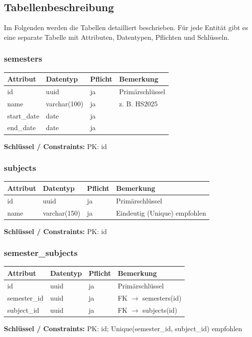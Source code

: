 \documentclass[12pt,a4paper]{article}
\begin{document}
    \subsection{Tabellenbeschreibung}
    Im Folgenden werden die Tabellen detailliert beschrieben. Für jede Entität gibt es eine separate Tabelle mit Attributen, Datentypen, Pflichten und Schlüsseln.

    \subsubsection{semesters}
    \begin{longtable}{|L{4cm}|L{3cm}|L{3cm}|L{4cm}|}
        \hline
        \textbf{Attribut} & \textbf{Datentyp} & \textbf{Pflicht} & \textbf{Bemerkung} \\ \hline
        id & uuid & ja & Primärschlüssel \\ \hline
        name & varchar(100) & ja & z. B. HS2025 \\ \hline
        start\_date & date & ja &  \\ \hline
        end\_date & date & ja &  \\ \hline
    \end{longtable}
    \textbf{Schlüssel / Constraints:} PK: id

    \subsubsection{subjects}
    \begin{longtable}{|L{4cm}|L{3cm}|L{3cm}|L{4cm}|}
        \hline
        \textbf{Attribut} & \textbf{Datentyp} & \textbf{Pflicht} & \textbf{Bemerkung} \\ \hline
        id & uuid & ja & Primärschlüssel \\ \hline
        name & varchar(150) & ja & Eindeutig (Unique) empfohlen \\ \hline
    \end{longtable}
    \textbf{Schlüssel / Constraints:} PK: id

    \subsubsection{semester\_subjects}
    \begin{longtable}{|L{4cm}|L{3cm}|L{3cm}|L{4cm}|}
        \hline
        \textbf{Attribut} & \textbf{Datentyp} & \textbf{Pflicht} & \textbf{Bemerkung} \\ \hline
        id & uuid & ja & Primärschlüssel \\ \hline
        semester\_id & uuid & ja & FK $\rightarrow$ semesters(id) \\ \hline
        subject\_id & uuid & ja & FK $\rightarrow$ subjects(id) \\ \hline
    \end{longtable}
    \textbf{Schlüssel / Constraints:} PK: id; Unique(semester\_id, subject\_id) empfohlen
\end{document}

